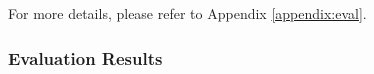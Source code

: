 For more details, please refer to Appendix \ref{appendix:eval}.


\subsubsection{Evaluation Results}




